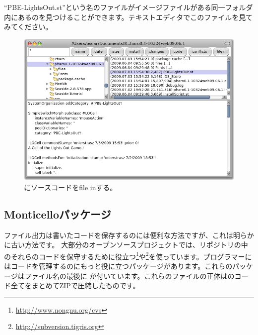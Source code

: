 \documentclass[a4paper,10pt,twoside]{book}
\begin{document}
``PBE-LightsOut.st''という名のファイルがイメージファイルがある同一フォルダ内にあるのを見つけることができます。テキストエディタでこのファイルを見てみてください。


\begin{figure}[ht]
\centerline {\includegraphics[width=\textwidth]{FileIn}}
\caption{\pharo にソースコードをfile inする。
}
\end{figure}

\subsection{Monticelloパッケージ}
ファイル出力は書いたコードを保存するのには便利な方法ですが、これは明らかに古い方法です。
大部分のオープンソースプロジェクトでは、リポジトリの中のそれらのコードを保守するために役立つ\footnote{\url{http://www.nongnu.org/cvs}}や\footnote{\url{http://subversion.tigris.org}}を使っています。\pharo プログラマーにはコードを管理するのにもっと役に立つパッケージがあります。これらのパッケージはファイル名の最後に が付いています。これらのファイルの正体はのコード全てをまとめてZIPで圧縮したものです。
\end{document}

